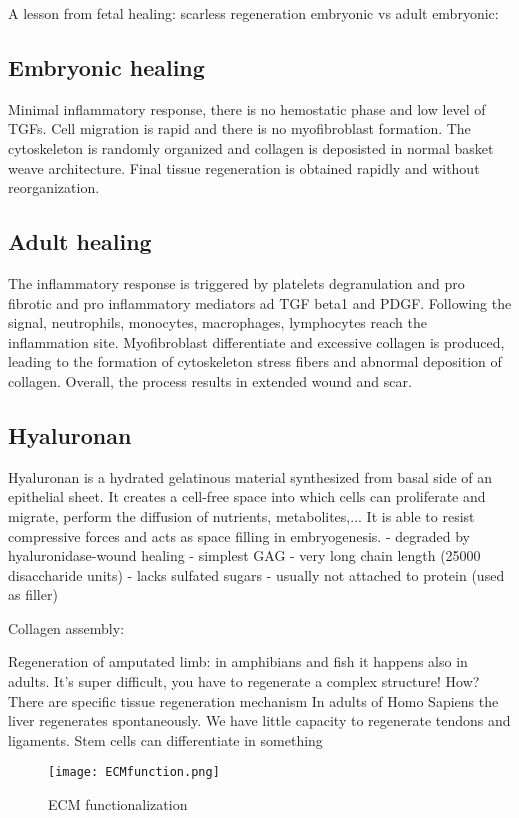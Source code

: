 A lesson from fetal healing: scarless regeneration embryonic vs adult embryonic:

\subsection{Embryonic healing}
Minimal inflammatory response, there is no hemostatic phase and low level of TGFs. Cell migration is rapid and there is no myofibroblast formation. The cytoskeleton is randomly organized and collagen is deposisted in normal basket weave architecture.  Final tissue regeneration is obtained rapidly and without reorganization.

\subsection{Adult healing}
The inflammatory response is triggered by platelets degranulation and pro fibrotic and pro inflammatory mediators ad TGF beta1 and PDGF. Following the signal, neutrophils, monocytes, macrophages, lymphocytes reach the inflammation site. Myofibroblast differentiate and excessive collagen is produced, leading to the formation of cytoskeleton stress fibers and abnormal deposition of collagen. Overall, the process results in extended wound and scar.

\subsection{Hyaluronan}
Hyaluronan is a hydrated gelatinous material	synthesized from basal side of an epithelial sheet. 
It creates a cell-free space into which cells can proliferate and migrate, perform the diffusion of nutrients, metabolites,...
It is able to resist compressive forces and acts as space filling in embryogenesis.
-	degraded by hyaluronidase-wound healing
-	simplest GAG
-	very long chain length (25000 disaccharide units)
-	lacks sulfated sugars
-	usually not attached to protein (used as filler)
 
 
Collagen assembly:
 
Regeneration of amputated limb: in amphibians and fish it happens also in adults. It’s super difficult, you have to regenerate a complex structure! How? There are specific tissue regeneration mechanism
In adults of Homo Sapiens the liver regenerates spontaneously. We have little capacity to regenerate tendons and ligaments. Stem cells can differentiate in something
 

\begin{figure}[h]
\texttt{[image: ECMfunction.png]}
\caption{\label{fig:ECM} ECM functionalization}
\end{figure}
